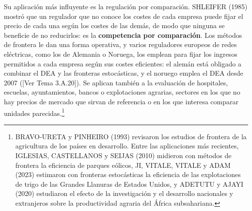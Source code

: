 \documentclass[10pt,a4paper]{article}
\newcommand{\authorfont}[1]{{\fontfamily{EBGaramond-TLF}\selectfont #1}}
\begin{document}
Su aplicación más influyente es la regulación por comparación. SHLEIFER (1985) mostró que un regulador que no conoce los costes de cada empresa puede fijar el precio de cada una según los costes de las demás, de modo que ninguna se beneficie de no reducirlos: es la \textbf{competencia por comparación}. Los métodos de frontera le dan una forma operativa, y varios reguladores europeos de redes eléctricas, como los de Alemania o Noruega, los emplean para fijar los ingresos permitidos a cada empresa según sus costes eficientes: el alemán está obligado a combinar el DEA y las fronteras estocásticas, y el noruego emplea el DEA desde 2007 ([\authorfont{Ver Tema 3.A.20}]). Se aplican también a la evaluación de hospitales, escuelas, ayuntamientos, bancos o explotaciones agrarias, sectores en los que no hay precios de mercado que sirvan de referencia o en los que interesa comparar unidades parecidas.\footnote{%
    BRAVO-URETA y PINHEIRO (1993) revisaron los estudios de frontera de la agricultura de los países en desarrollo. Entre las aplicaciones más recientes, IGLESIAS, CASTELLANOS y SEIJAS (2010) midieron con métodos de frontera la eficiencia de parques eólicos, JI, VITALE, VITALE y ADAM (2023) estimaron con fronteras estocásticas la eficiencia de las explotaciones de trigo de las Grandes Llanuras de Estados Unidos, y ADETUTU y AJAYI (2020) estudiaron el efecto de la investigación y el desarrollo nacionales y extranjeros sobre la productividad agraria del África subsahariana.
}
\end{document}
